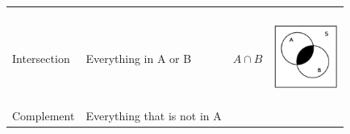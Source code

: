 \begin{center}
\begin{xtabular*}{\mytablewidth}[t]{|p{10\mystarwidth}|p{10\mystarwidth}|p{10\mystarwidth}|p{10\mystarwidth}|}
\begin{center}
      \vspace{2pt}
    \vspace{.1in}
    \end{center}    %
     \tabularnewline{}
        Intersection &
        Everything in A or B &
        $A\cap B$ &
    \setcounter{subfigure}{0}
\label{m39373*uid14587}
    \begin{center}
    \label{m39373*uid14587!!!underscore!!!media}\label{m39373*uid14587!!!underscore!!!printimage}\includegraphics[width=80px]{col11306.imgs/m39373_intersect.png} %
      \vspace{2pt}
    \vspace{.1in}
    \end{center}    %
     \tabularnewline{}
        Complement &
        Everything that is not in A &

\end{xtabular*}
\end{center}
